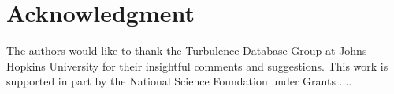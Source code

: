 \documentclass{sig-alternate}
\begin{document}

\section{Acknowledgment}

The authors would like to thank the Turbulence Database Group at Johns Hopkins University for
their insightful comments and suggestions. This work is supported in part by the National Science Foundation
under Grants ....

\end{document}
